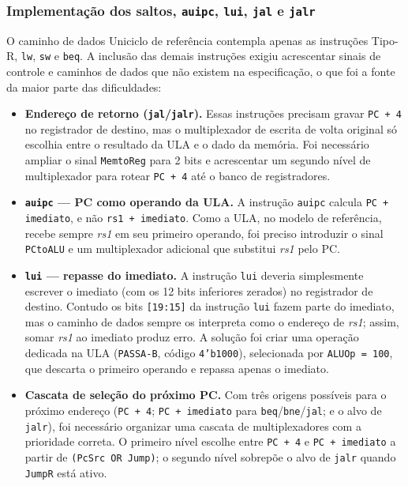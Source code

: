 \documentclass[conference]{IEEEtran}
\begin{document}
\subsubsection{Implementação dos saltos, \texttt{auipc}, \texttt{lui}, \texttt{jal} e \texttt{jalr}}
O caminho de dados Uniciclo de referência \cite{patterson2020computer} contempla apenas as instruções
Tipo-R, \texttt{lw}, \texttt{sw} e \texttt{beq}. A inclusão das demais instruções exigiu acrescentar
sinais de controle e caminhos de dados que não existem na especificação, o que foi a fonte da
maior parte das dificuldades:

\begin{itemize}
    \item \textbf{Endereço de retorno (\texttt{jal}/\texttt{jalr}).} Essas instruções precisam gravar
    \texttt{PC + 4} no registrador de destino, mas o multiplexador de escrita de volta original só escolhia
    entre o resultado da ULA e o dado da memória. Foi necessário ampliar o sinal \texttt{MemtoReg} para 2
    bits e acrescentar um segundo nível de multiplexador para rotear \texttt{PC + 4} até o banco de
    registradores.

    \item \textbf{\texttt{auipc} — PC como operando da ULA.} A instrução \texttt{auipc} calcula
    \texttt{PC + imediato}, e não \texttt{rs1 + imediato}. Como a ULA, no modelo de referência, recebe
    sempre \textit{rs1} em seu primeiro operando, foi preciso introduzir o sinal \texttt{PCtoALU} e um
    multiplexador adicional que substitui \textit{rs1} pelo PC.

    \item \textbf{\texttt{lui} — repasse do imediato.} A instrução \texttt{lui} deveria simplesmente
    escrever o imediato (com os 12 bits inferiores zerados) no registrador de destino. Contudo os bits 
    \texttt{[19:15]} da instrução \texttt{lui} fazem parte do imediato, mas o caminho de dados
    sempre os interpreta como o endereço de \textit{rs1}; assim, somar \textit{rs1} ao imediato produz erro. 
    A solução foi criar uma operação dedicada na ULA (\texttt{PASSA-B}, código \texttt{4'b1000}), 
    selecionada por \texttt{ALUOp = 100}, que descarta o primeiro operando e repassa apenas o imediato.

    \item \textbf{Cascata de seleção do próximo PC.} Com três origens possíveis para o próximo endereço
    (\texttt{PC + 4}; \texttt{PC + imediato} para \texttt{beq}/\texttt{bne}/\texttt{jal}; e o alvo de
    \texttt{jalr}), foi necessário organizar uma cascata de multiplexadores com a prioridade correta. O
    primeiro nível escolhe entre \texttt{PC + 4} e \texttt{PC + imediato} a partir de
    \texttt{(PcSrc OR Jump)}; o segundo nível sobrepõe o alvo de \texttt{jalr} quando \texttt{JumpR} está
    ativo.


\end{itemize}
\end{document}
